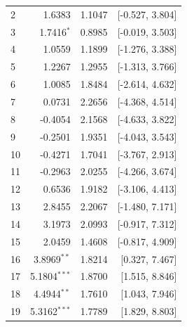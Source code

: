 \begin{longtable}{lrrr}
2 & 1.6383 & 1.1047 & [-0.527, 3.804] \\
3 & 1.7416$^{*}$ & 0.8985 & [-0.019, 3.503] \\
4 & 1.0559 & 1.1899 & [-1.276, 3.388] \\
5 & 1.2267 & 1.2955 & [-1.313, 3.766] \\
6 & 1.0085 & 1.8484 & [-2.614, 4.632] \\
7 & 0.0731 & 2.2656 & [-4.368, 4.514] \\
8 & -0.4054 & 2.1568 & [-4.633, 3.822] \\
9 & -0.2501 & 1.9351 & [-4.043, 3.543] \\
10 & -0.4271 & 1.7041 & [-3.767, 2.913] \\
11 & -0.2963 & 2.0255 & [-4.266, 3.674] \\
12 & 0.6536 & 1.9182 & [-3.106, 4.413] \\
13 & 2.8455 & 2.2067 & [-1.480, 7.171] \\
14 & 3.1973 & 2.0993 & [-0.917, 7.312] \\
15 & 2.0459 & 1.4608 & [-0.817, 4.909] \\
16 & 3.8969$^{**}$ & 1.8214 & [0.327, 7.467] \\
17 & 5.1804$^{***}$ & 1.8700 & [1.515, 8.846] \\
18 & 4.4944$^{**}$ & 1.7610 & [1.043, 7.946] \\
19 & 5.3162$^{***}$ & 1.7789 & [1.829, 8.803] \\
\end{longtable}
